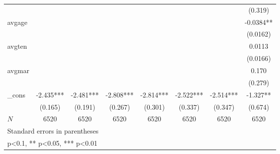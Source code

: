 \begin{table}[htbp]
\begin{tabular}{l*{7}{c}}
            &               &               &               &               &               &               &     (0.319)   \\
[1em]
avgage      &               &               &               &               &               &               &     -0.0384** \\
            &               &               &               &               &               &               &    (0.0162)   \\
[1em]
avgten      &               &               &               &               &               &               &      0.0113   \\
            &               &               &               &               &               &               &    (0.0166)   \\
[1em]
avgmar      &               &               &               &               &               &               &       0.170   \\
            &               &               &               &               &               &               &     (0.279)   \\
[1em]
\_cons      &      -2.435***&      -2.481***&      -2.808***&      -2.814***&      -2.522***&      -2.514***&      -1.327** \\
            &     (0.165)   &     (0.191)   &     (0.267)   &     (0.301)   &     (0.337)   &     (0.347)   &     (0.674)   \\
\hline
\(N\)       &        6520   &        6520   &        6520   &        6520   &        6520   &        6520   &        6520   \\
\hline\hline
\multicolumn{8}{l}{\footnotesize Standard errors in parentheses}\\
\multicolumn{8}{l}{\footnotesize * p<0.1, ** p<0.05, *** p<0.01}\\
\end{tabular}
\end{table}

